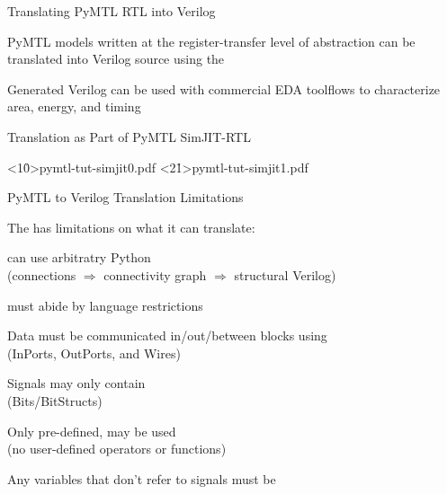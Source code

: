 \begin{frame}{Translating PyMTL RTL into Verilog}

\begin{cbxlist}

  \1 PyMTL models written at the register-transfer level of abstraction
     can be translated into Verilog source using the 

  \1 Generated Verilog can be used with commercial EDA toolflows to
    characterize area, energy, and timing

\end{cbxlist}

\vspace{0.3in}

\end{frame}

\begin{frame}{Translation as Part of PyMTL SimJIT-RTL}

  \vspace{0.2in}
  \cbxfigc<1\h0>{pymtl-tut-simjit0.pdf}
  \cbxfigc<2\h1>{pymtl-tut-simjit1.pdf}

\end{frame}

\begin{frame}{PyMTL to Verilog Translation Limitations}

{}The  has limitations on what it can translate:

\medskip
\begin{cbxlist}[ll]

  \1  can use arbitratry Python \\ (connections
        $\Rightarrow$ connectivity graph $\Rightarrow$ structural
        Verilog)

  \1  must abide by language restrictions

  \pause

    \2 Data must be communicated in/out/between blocks using  \\
       (InPorts, OutPorts, and Wires)

    \2 Signals may only contain  \\
       (Bits/BitStructs)

    \2 Only pre-defined,  may be
       used \\ (no user-defined operators or functions)

    \2 Any variables that don't refer to signals must be 

\end{cbxlist}
\end{frame}


